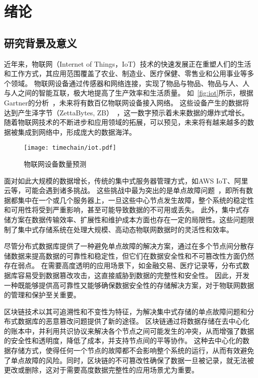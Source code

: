 
\chapter{绪论}
\section{研究背景及意义}
近年来，物联网（Internet of Things，IoT）技术的快速发展正在重塑人们的生活和工作方式，其应用范围覆盖了农业、制造业、医疗保健、零售业和公用事业等多个领域。
物联网设备通过传感器和网络连接，实现了物品与物品、物品与人、人与人之间的智能互联，极大地提高了生产效率和生活质量。
如~\autoref{fig:iot}所示，根据Gartner的分析~\cite{hung2017leading}，未来将有数百亿物联网设备接入网络。
这些设备产生的数据将达到产生泽字节（ZettaBytes, ZB）~\cite{al2020internet}，这一数字预示着未来数据的爆炸式增长。
随着物联网技术的不断进步和应用领域的拓展，可以预见，未来将有越来越多的数据被集成到网络中，形成庞大的数据海洋。

\begin{figure}[t]
    \centering
    \texttt{[image: timechain/iot.pdf]}
    \caption{物联网设备数量预测}
    \label{fig:iot}
\end{figure}

面对如此大规模的数据增长，传统的集中式服务器管理方式，如AWS IoT、阿里云等，可能会遇到诸多挑战。
这些挑战中最为突出的是单点故障问题~\cite{gill2011understanding}，即所有数据都集中在一个或几个服务器上，一旦这些中心节点发生故障，整个系统的稳定性和可用性将受到严重影响，甚至可能导致数据的不可用或丢失。
此外，集中式存储方案在数据传输效率、扩展性和维护成本方面也存在一定的局限性。这些问题限制了集中式存储系统在处理大规模、高动态物联网数据时的灵活性和效率。

尽管分布式数据库提供了一种避免单点故障的解决方案，通过在多个节点间分散存储数据来提高数据的可靠性和稳定性，但它们在数据安全性和不可篡改性方面仍然存在弱点。
在需要高度透明的应用场景下，如金融交易、医疗记录等，分布式数据库容易受到数据篡改攻击，这直接威胁到数据的完整性和安全性。
因此，开发一种既能够提供高可靠性又能够确保数据安全性的存储解决方案，对于物联网数据的管理和保护至关重要。

区块链技术以其可追溯性和不变性为特征，为解决集中式存储的单点故障问题和分布式数据库的恶意篡改问题提供了新的途径。
区块链通过将数据存储在去中心化的账本中，并利用共识协议来解决各个节点之间可能发生的冲突，从而增强了数据的安全性和透明度，降低了成本，并支持节点间的平等协作。
这种去中心化的数据存储方式，使得任何一个节点的故障都不会影响整个系统的运行，从而有效避免了单点故障的风险。同时，区块链的不可篡改性确保了数据一旦被记录，就无法被更改或删除，这对于需要高度数据完整性的应用场景尤为重要。

